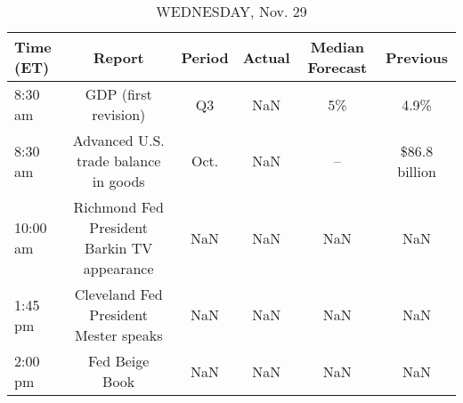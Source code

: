 \documentclass{article}%
\begin{document}
\begin{table}[htbp]%
\caption{WEDNESDAY, Nov. 29}%
\centering%
\begin{adjustbox}{width=1\textwidth}%
\begin{tabular}{lccccc}
\toprule
Time (ET) &                                      Report & Period & Actual & Median Forecast &      Previous \\
\midrule
  8:30 am &                        GDP (first revision) &     Q3 &    NaN &              5\% &          4.9\% \\
  8:30 am &        Advanced U.S. trade balance in goods &   Oct. &    NaN &              -- & \$86.8 billion \\
 10:00 am & Richmond Fed President Barkin TV appearance &    NaN &    NaN &             NaN &           NaN \\
  1:45 pm &       Cleveland Fed President Mester speaks &    NaN &    NaN &             NaN &           NaN \\
  2:00 pm &                              Fed Beige Book &    NaN &    NaN &             NaN &           NaN \\
\bottomrule
\end{tabular}
%
\end{adjustbox}%
\end{table}

%
\end{document}
